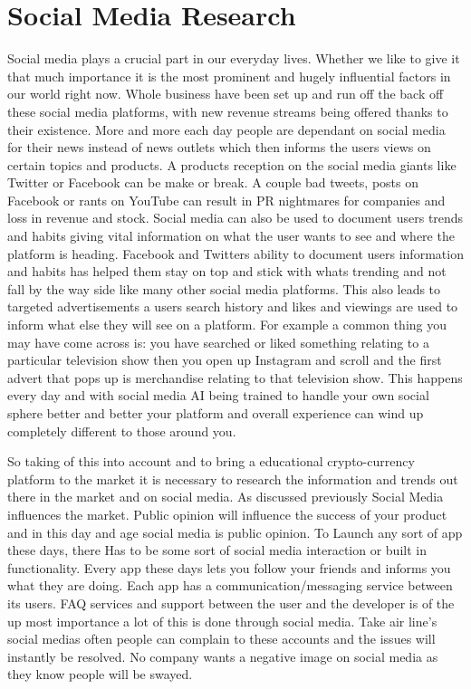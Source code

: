 \section{Social Media Research}

Social media plays a crucial part in our everyday lives. Whether we like to give it that much importance it is the most prominent and hugely influential factors in our world right now. Whole business have been set up and run off the back off these social media platforms, with new revenue streams being offered thanks to their existence. More and more each day people are dependant on social media for their news instead of news outlets which then informs the users views on certain topics and products. A products reception on the social media giants like Twitter or Facebook can be make or break. A couple bad tweets, posts on Facebook or rants on YouTube can result in PR nightmares for companies and loss in revenue and stock. Social media can also be used to document users trends and habits giving vital information on what the user wants to see and where the platform is heading. 
Facebook and Twitters ability to document users information and habits has helped them stay on top and stick with whats trending and not fall by the way side like many other social media platforms. This also leads to targeted advertisements a users search history and likes and viewings are used to inform what else they will see on a platform. For example a common thing you may have come across is: you have searched or liked something relating to a particular television show then you open up Instagram and scroll and the first advert that pops up is merchandise relating to that television show. This happens every day and with social media AI being trained to handle your own social sphere better and better your platform and overall experience can wind up completely different to those around you. 

So taking of this into account and to bring a educational crypto-currency platform to the market it is necessary to research the information and trends out there in the market and on social media. As discussed previously Social Media influences the market. Public opinion will influence the success of your product and in this day and age social media is public opinion. To Launch any sort of app these days, there Has to be some sort of social media interaction or built in functionality. Every app these days lets you follow your friends and informs you what they are doing. Each app has a communication/messaging service between its users. FAQ services and support between the user and the developer is of the up most importance a lot of this is done through social media. Take air line's social medias often people can complain to these accounts and the issues will instantly be resolved. No company wants a negative image on social media as they know people will be swayed. 

